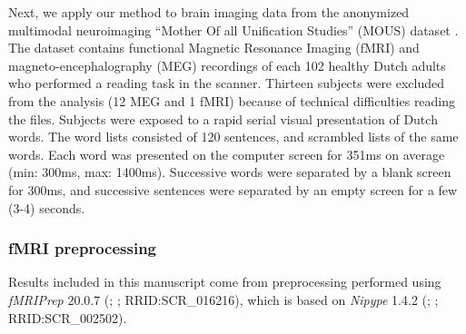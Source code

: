 
Next, we apply our method to brain imaging data from the anonymized multimodal
neuroimaging ``Mother Of all Unification Studies'' (MOUS) dataset
\citep{schoffelen2019204}. The dataset contains functional Magnetic Resonance
Imaging (fMRI) and magneto-encephalography (MEG)
recordings of each 102 healthy Dutch adults who performed a reading
task in the scanner. Thirteen subjects were excluded from the analysis (12 MEG and 1 fMRI)
because of technical difficulties reading the files.
%
Subjects were exposed to a rapid serial visual presentation of Dutch words. The
word lists consisted of 120 sentences, and scrambled lists of the same words.
Each word was presented on the computer screen for 351ms on average (min: 300ms,
max: 1400ms). Successive words were separated by a blank screen for 300ms, and
successive sentences were separated by an empty screen for a few (3-4) seconds.

\subsubsection{fMRI preprocessing}
Results included in this manuscript come from preprocessing performed
using \emph{fMRIPrep} 20.0.7 (\citep{fmriprep1}; \citep{fmriprep2};
RRID:SCR\_016216), which is based on \emph{Nipype} 1.4.2
(\citep{nipype1}; \citep{nipype2}; RRID:SCR\_002502).

